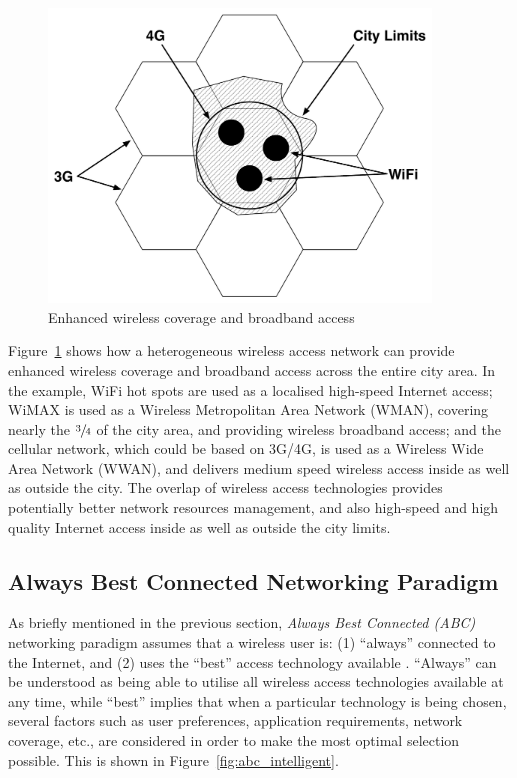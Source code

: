\begin{figure}[t]
    \centering
    \includegraphics[width=4in]{Intelligent/Figures/wireless_city}
    \caption{Enhanced wireless coverage and broadband access}
    \label{fig:wireless_city_intelligent}
\end{figure}

Figure~\ref{fig:wireless_city_intelligent} shows how a heterogeneous wireless access network can provide enhanced wireless coverage and broadband access across the entire city area. In the example, WiFi hot spots are used as a localised high-speed Internet access; WiMAX is used as a Wireless Metropolitan Area Network (WMAN), covering nearly the $\sfrac{3}{4}$ of the city area, and providing wireless broadband access; and the cellular network, which could be based on 3G/4G, is used as a Wireless Wide Area Network (WWAN), and delivers medium speed wireless access inside as well as outside the city. The overlap of wireless access technologies provides potentially better network resources management, and also high-speed and high quality Internet access inside as well as outside the city limits.

\subsection{Always Best Connected Networking Paradigm} %
\label{sub:always_best_connected_networking_paradigm_intelligent}
As briefly mentioned in the previous section, \emph{Always Best Connected (ABC)} networking paradigm assumes that a wireless user is: (1) ``always'' connected to the Internet, and (2) uses the ``best'' access technology available \cite{ABC03}. ``Always'' can be understood as being able to utilise all wireless access technologies available at any time, while ``best'' implies that when a particular technology is being chosen, several factors such as user preferences, application requirements, network coverage, etc., are considered in order to make the most optimal selection possible. This is shown in Figure~\ref{fig:abc_intelligent}.

